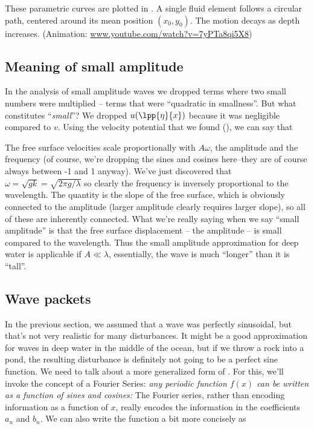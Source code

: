 \documentclass[12pt]{book}
\renewcommand{\and}{{\xspace \mathrm{and}\xspace}}
\begin{document}
These parametric curves are plotted in .  A single fluid element follows a circular path, centered around its mean position $(x_0,y_0)$. The motion decays as depth increases. (Animation: \url{www.youtube.com/watch?v=7yPTa8qi5X8})



\subsection{Meaning of small amplitude}
In the analysis of small amplitude waves we dropped terms where two small numbers were multiplied -- terms that were ``quadratic in smallness''.  But what constitutes ``\textit{small}''?  We dropped $u(\lpp{\eta}{x})$ because it was  negligible compared to $v$.  Using the velocity potential that we found (), we can say that
\unnumeq{\abs{u}=\abs{\pp{\phi}{x}}\sim A\omega\qquad\and\qquad \abs{v} = \abs{\pp{\phi}{x}} \sim A\omega. }

The free surface velocities scale proportionally with $A\omega$, the amplitude and the frequency (of course, we're dropping the sines and cosines here--they are of course always between -1 and 1 anyway). We've just discovered that $\omega = \sqrt{gk} = \sqrt{2\pi g/\lambda}$ so clearly the frequency is inversely proportional to the wavelength. The quantity  is the slope of the free surface, which is obviously connected to the amplitude (larger amplitude clearly requires larger slope), so all of these are inherently connected.  What we're really saying when we say ``small amplitude'' is that the free surface displacement -- the amplitude --  is small compared to the wavelength.  Thus the small amplitude approximation for deep water is applicable if $A\ll\lambda$, essentially, the wave is much ``longer'' than it is ``tall''.


\subsection{Wave packets}

In the previous section, we assumed that a wave was perfectly sinusoidal, but that's not very realistic for many disturbances.  It might be a good approximation for waves in deep water in the middle of the ocean, but if we throw a rock into a pond, the resulting disturbance is definitely not going to be a perfect sine function.  We need to talk about a more generalized form of .  For this, we'll invoke the concept of a Fourier Series: \textit{any periodic function $f(x)$ can be written as a function of sines and cosines:}
The Fourier series, rather than encoding information as a function of $x$, really encodes the information in the coefficients $a_n$ and $b_n$.  We can also write the function a bit more concisely as
\end{document}
